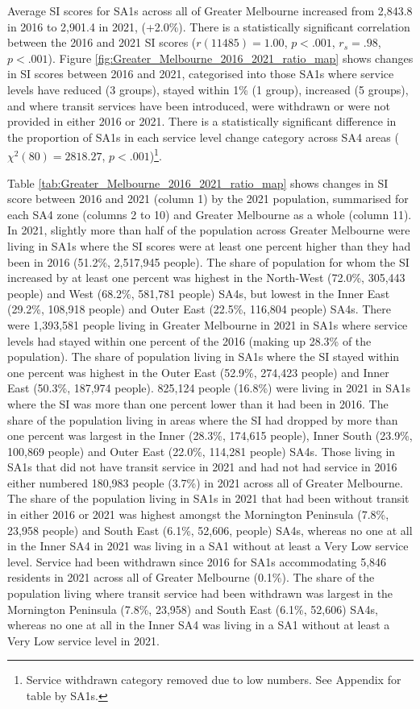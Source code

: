 \documentclass[preprint, 3p,
authoryear]{elsarticle} %
\begin{document}
Average SI scores for SA1s across all of Greater Melbourne increased
from 2,843.8 in 2016 to 2,901.4 in 2021, (+2.0\%). There is a
statistically significant correlation between the 2016 and 2021 SI
scores (\(r(11485) = 1.00\), \(p < .001\), \(r_s =.98\), \(p < .001\)).
Figure \ref{fig:Greater_Melbourne_2016_2021_ratio_map} shows changes in
SI scores between 2016 and 2021, categorised into those SA1s where
service levels have reduced (3 groups), stayed within 1\% (1 group),
increased (5 groups), and where transit services have been introduced,
were withdrawn or were not provided in either 2016 or 2021. There is a
statistically significant difference in the proportion of SA1s in each
service level change category across SA4 areas
(\(\chi^2(80) = 2818.27\), \(p < .001\))\footnote{Service withdrawn
  category removed due to low numbers. See Appendix for table by SA1s.}.

Table \ref{tab:Greater_Melbourne_2016_2021_ratio_map} shows changes in
SI score between 2016 and 2021 (column 1) by the 2021 population,
summarised for each SA4 zone (columns 2 to 10) and Greater Melbourne as
a whole (column 11). In 2021, slightly more than half of the population
across Greater Melbourne were living in SA1s where the SI scores were at
least one percent higher than they had been in 2016 (51.2\%, 2,517,945
people). The share of population for whom the SI increased by at least
one percent was highest in the North-West (72.0\%, 305,443 people) and
West (68.2\%, 581,781 people) SA4s, but lowest in the Inner East
(29.2\%, 108,918 people) and Outer East (22.5\%, 116,804 people) SA4s.
There were 1,393,581 people living in Greater Melbourne in 2021 in SA1s
where service levels had stayed within one percent of the 2016 (making
up 28.3\% of the population). The share of population living in SA1s
where the SI stayed within one percent was highest in the Outer East
(52.9\%, 274,423 people) and Inner East (50.3\%, 187,974 people).
825,124 people (16.8\%) were living in 2021 in SA1s where the SI was
more than one percent lower than it had been in 2016. The share of the
population living in areas where the SI had dropped by more than one
percent was largest in the Inner (28.3\%, 174,615 people), Inner South
(23.9\%, 100,869 people) and Outer East (22.0\%, 114,281 people) SA4s.
Those living in SA1s that did not have transit service in 2021 and had
not had service in 2016 either numbered 180,983 people (3.7\%) in 2021
across all of Greater Melbourne. The share of the population living in
SA1s in 2021 that had been without transit in either 2016 or 2021 was
highest amongst the Mornington Peninsula (7.8\%, 23,958 people) and
South East (6.1\%, 52,606, people) SA4s, whereas no one at all in the
Inner SA4 in 2021 was living in a SA1 without at least a Very Low
service level. Service had been withdrawn since 2016 for SA1s
accommodating 5,846 residents in 2021 across all of Greater Melbourne
(0.1\%). The share of the population living where transit service had
been withdrawn was largest in the Mornington Peninsula (7.8\%, 23,958)
and South East (6.1\%, 52,606) SA4s, whereas no one at all in the Inner
SA4 was living in a SA1 without at least a Very Low service level in
2021.
\end{document}
